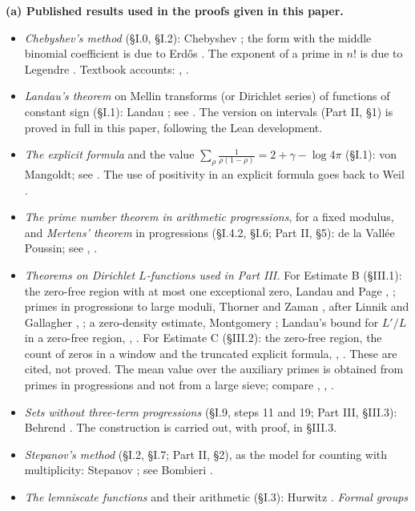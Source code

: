 \documentclass[11pt,letterpaper]{article}
\begin{document}
\textbf{(a) Published results used in the proofs given in this paper.}
\begin{itemize}
\item \emph{Chebyshev's method} (\S I.0, \S I.2): Chebyshev \cite{Che52}; the form with the middle binomial
coefficient is due to Erd\H{o}s \cite{Erd32}. The exponent of a prime in $n!$ is
due to Legendre \cite{Leg08}. Textbook accounts: \cite[Ch.~4]{Apo76}, \cite[Ch.~7]{Dav00}.
\item \emph{Landau's theorem} on Mellin transforms (or Dirichlet series) of functions of constant sign
(\S I.1): Landau \cite{Lan05}; see \cite[\S15.1]{MV07}. The version on intervals (Part II, \S1) is proved in
full in this paper, following the Lean development.
\item \emph{The explicit formula} and the value $\sum_\rho\frac1{\rho(1-\rho)}=2+\gamma-\log4\pi$ (\S I.1):
von Mangoldt; see \cite[Ch.~12 and 17]{Dav00}. The use of positivity in an explicit formula goes back to
Weil \cite{Wei52}.
\item \emph{The prime number theorem in arithmetic progressions}, for a fixed modulus, and
\emph{Mertens' theorem} in progressions (\S I.4.2, \S I.6; Part II, \S5): de la Vall\'ee Poussin; see
\cite[Ch.~20 and 22]{Dav00}, \cite[Ch.~11]{MV07}.
\item \emph{Theorems on Dirichlet $L$-functions used in Part III.} For Estimate B (\S III.1): the zero-free
region with at most one exceptional zero, Landau and Page \cite{Pag35}, \cite[Ch.~14]{Dav00}; primes in
progressions to large moduli, Thorner and Zaman \cite{TZ21}, after Linnik and Gallagher \cite{Gal70},
\cite{Bom87}; a zero-density estimate, Montgomery \cite{Mon71}; Landau's bound for $L'/L$ in a zero-free
region, \cite{Tit86}, \cite{MV07}. For Estimate C (\S III.2): the zero-free region, the count of zeros in a
window and the truncated explicit formula, \cite[Ch.~14, 16, 19]{Dav00}, \cite[Ch.~11, 12]{MV07}. These are
cited, not proved. The mean value over the auxiliary primes is obtained from primes in progressions and not
from a large sieve; compare \cite{Bom65}, \cite{DH66}, \cite{HB95}.
\item \emph{Sets without three-term progressions} (\S I.9, steps 11 and 19; Part III, \S III.3): Behrend
\cite{Beh46}. The construction is carried out, with proof, in \S III.3.
\item \emph{Stepanov's method} (\S I.2, \S I.7; Part II, \S2), as the model for counting with multiplicity:
Stepanov \cite{Ste69}; see Bombieri \cite{Bom74}.
\item \emph{The lemniscate functions} and their arithmetic (\S I.3): Hurwitz \cite{Hur99}. \emph{Formal groups
}
\end{itemize}
\end{document}
